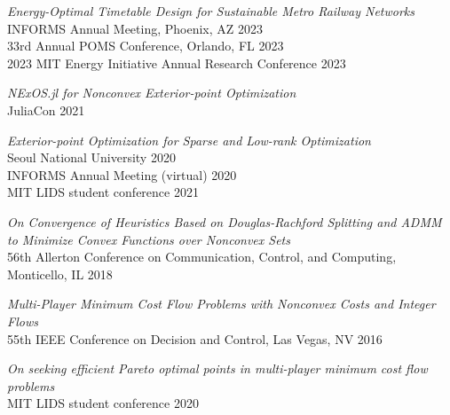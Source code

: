 \documentclass[margin,line,pifont]{./FontsAndCls/custom_res}
\begin{document}
\begin{resume}
\noindent \begin{minipage} {\textwidth}
\textit{Energy-Optimal Timetable Design for Sustainable Metro Railway Networks}\\
INFORMS Annual Meeting, Phoenix, AZ \hfill  2023 \\
33rd Annual POMS Conference, Orlando, FL \hfill 2023 \\
2023 MIT Energy Initiative Annual Research Conference  \hfill 2023 
\end{minipage}

\noindent \begin{minipage} {\textwidth}
\textit{NExOS.jl for Nonconvex Exterior-point Optimization} \\
JuliaCon \hfill 2021
\end{minipage}

\noindent \begin{minipage} {\textwidth}
\textit{Exterior-point Optimization for Sparse and Low-rank Optimization} \\
Seoul National University \hfill 2020 \\
INFORMS Annual Meeting (virtual) \hfill 2020 \\
MIT LIDS student conference \hfill 2021
\end{minipage}

\noindent \begin{minipage} {\textwidth}
\textit{On Convergence of Heuristics Based on Douglas-Rachford Splitting and ADMM to Minimize Convex Functions over Nonconvex Sets}\\
56th Allerton Conference on Communication, Control, and Computing,  Monticello, IL \hfill 2018
\end{minipage}

\noindent \begin{minipage} {\textwidth}
\textit{Multi-Player Minimum Cost Flow Problems with Nonconvex Costs and Integer Flows}\\
55th IEEE Conference on Decision and Control, Las Vegas, NV \hfill 2016
\end{minipage}

\noindent \begin{minipage} {\textwidth}
\textit{On seeking efficient Pareto optimal points in multi-player minimum cost flow problems} \\
MIT LIDS student conference \hfill 2020
\end{minipage}



\noindent\begin{minipage}{\textwidth}

\end{minipage}
\end{resume}
\end{document}
